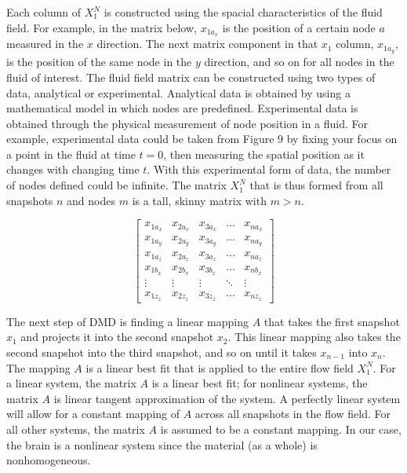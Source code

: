 \documentclass[%
 aip,
 amsmath,amssymb,
 reprint,%
 floatfix,%
]{revtex4-1}
\begin{document}
Each column of $X_1^N$ is constructed using the spacial characteristics of the fluid field. For example, in the matrix below, $x_{1a_x}$ is the position of a certain node $a$ measured in the $x$ direction. The next matrix component in that $x_1$ column, $x_{1a_y}$, is the position of the same node in the $y$ direction, and so on for all nodes in the fluid of interest. The fluid field matrix can be constructed using two types of data, analytical or experimental. Analytical data is obtained by using a mathematical model in which nodes are predefined. Experimental data is obtained through the physical measurement of node position in a fluid. For example, experimental data could be taken from Figure 9 by fixing your focus on a point in the fluid at time $t=0$, then measuring the spatial position as it changes with changing time $t$. With this experimental form of data, the number of nodes defined could be infinite. The matrix $X_1^N$ that is thus formed from all snapshots $n$ and nodes $m$ is a tall, skinny matrix with $m > n$.


$$
\begin{bmatrix}
    			x_{1a_x}       & x_{2a_x} & x_{3a_x} & \dots & x_{na_x} \\
    			x_{1a_y}       & x_{2a_y} & x_{3a_y} & \dots & x_{na_y} \\
    			x_{1a_z}       & x_{2a_z} & x_{3a_z} & \dots & x_{na_z} \\
    			x_{1b_x}       & x_{2b_x} & x_{3b_x} & \dots & x_{nb_x} \\
    			\vdots & \vdots & \vdots & \ddots & \vdots \\
    			x_{1z_z}       & x_{2z_z} & x_{3z_z} & \dots & x_{nz_z}
\end{bmatrix}
$$

The next step of DMD is finding a linear mapping $A$ that takes the first snapshot $x_1$ and projects it into the second snapshot $x_2$. This linear mapping also takes the second snapshot into the third snapshot, and so on until it takes $x_{n-1}$ into $x_n$. The mapping $A$ is a linear best fit that is applied to the entire flow field $X_1^N$. For a linear system, the matrix $A$ is a linear best fit; for nonlinear systems, the matrix $A$ is linear tangent approximation of the system. A perfectly linear system will allow for a constant mapping of $A$ across all snapshots in the flow field. For all other systems, the matrix $A$ is assumed to be a constant mapping. In our case, the brain is a nonlinear system since the material (as a whole) is nonhomogeneous.
\end{document}

